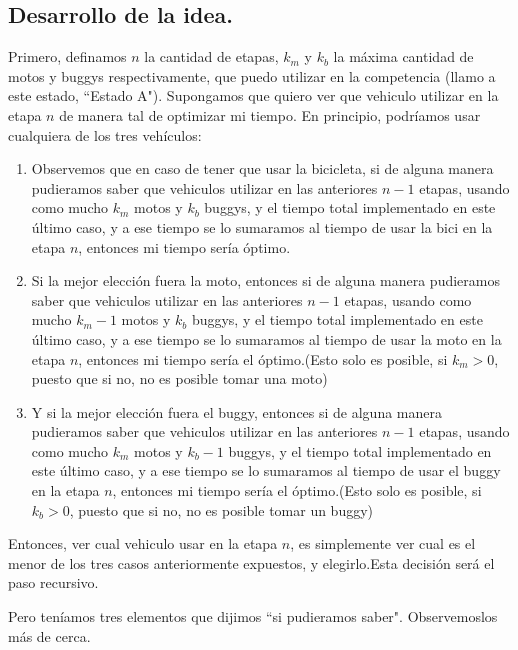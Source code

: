 \vspace*{0.6cm}
\subsection{Desarrollo de la idea.}

\vspace*{0.3cm}
Primero, definamos $n$ la cantidad de etapas, $k_{m}$ y $k_{b}$ la máxima cantidad de motos y buggys respectivamente, que puedo utilizar en la competencia (llamo a este estado, ``Estado A"). Supongamos que quiero ver que vehiculo utilizar en la etapa $n$ de manera tal de optimizar mi tiempo. En principio, podríamos usar cualquiera de los tres vehículos: 


\begin{enumerate}
	\item Observemos que en caso de tener que usar la bicicleta, si de alguna manera pudieramos saber que vehiculos utilizar en las anteriores $n-1$ etapas, usando como mucho $k_{m}$ motos y $k_{b}$ buggys, y el tiempo total implementado en este último caso, y a ese tiempo se lo sumaramos al tiempo de usar la bici en la etapa $n$, entonces mi tiempo sería óptimo.
	\item Si la mejor elección fuera la moto, entonces si de alguna manera pudieramos saber que vehiculos utilizar en las anteriores $n-1$ etapas, usando como mucho $k_{m}-1$ motos y $k_{b}$ buggys, y el tiempo total implementado en este último caso, y a ese tiempo se lo sumaramos al tiempo de usar la moto en la etapa $n$, entonces mi tiempo sería el óptimo.(Esto solo es posible, si $k_{m}>0$, puesto que si no, no es posible tomar una moto)
	\item Y si la mejor elección fuera el buggy, entonces si de alguna manera pudieramos saber que vehiculos utilizar en las anteriores $n-1$ etapas, usando como mucho $k_{m}$ motos y $k_{b}-1$ buggys, y el tiempo total implementado en este último caso, y a ese tiempo se lo sumaramos al tiempo de usar el buggy en la etapa $n$, entonces mi tiempo sería el óptimo.(Esto solo es posible, si $k_{b}>0$, puesto que si no, no es posible tomar un buggy)
	 
\end{enumerate}

Entonces, ver cual vehiculo usar en la etapa $n$, es simplemente ver cual es el menor de los tres casos anteriormente expuestos, y elegirlo.Esta decisión será el paso recursivo. 

Pero teníamos tres elementos que dijimos ``si pudieramos saber". Observemoslos más de cerca.

